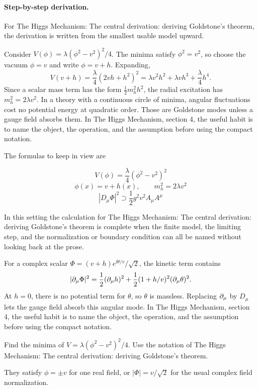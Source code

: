 \paragraph{Step-by-step derivation.}

For The Higgs Mechanism: The central derivation: deriving Goldstone's theorem, the derivation is written from the smallest usable model upward.

Consider \(V(\phi)=\lambda(\phi^2-v^2)^2/4\).  The minima satisfy \(\phi^2=v^2\), so choose the vacuum \(\phi=v\) and write \(\phi=v+h\).  Expanding,
\[
  V(v+h)=\frac{\lambda}{4}(2vh+h^2)^2
  =\lambda v^2h^2+\lambda vh^3+\frac{\lambda}{4}h^4.
\]
Since a scalar mass term has the form \(\frac12m_h^2h^2\), the radial excitation has \(m_h^2=2\lambda v^2\).  In a theory with a continuous circle of minima, angular fluctuations cost no potential energy at quadratic order.  Those are Goldstone modes unless a gauge field absorbs them.  In The Higgs Mechanism, section 4, the useful habit is to name the object, the operation, and the assumption before using the compact notation.

The formulas to keep in view are

\[
  V(\phi)=\frac{\lambda}{4}(\phi^2-v^2)^2
\]
\[
  \phi(x)=v+h(x),\qquad m_h^2=2\lambda v^2
\]
\[
  |D_\mu\Phi|^2\supset \frac12g^2v^2A_\mu A^\mu
\]

In this setting the calculation for The Higgs Mechanism: The central derivation: deriving Goldstone's theorem is complete when the finite model, the limiting step, and the normalization or boundary condition can all be named without looking back at the prose.




\begin{example}
For a complex scalar \(\Phi=(v+h)e^{\ii\theta/v}/\sqrt2\), the kinetic term contains
\[
  |\partial_\mu\Phi|^2=\frac12(\partial_\mu h)^2+\frac12(1+h/v)^2(\partial_\mu\theta)^2.
\]
At \(h=0\), there is no potential term for \(\theta\), so \(\theta\) is massless.  Replacing \(\partial_\mu\) by \(D_\mu\) lets the gauge field absorb this angular mode.  In The Higgs Mechanism, section 4, the useful habit is to name the object, the operation, and the assumption before using the compact notation.
\end{example}



\begin{exercise}
Find the minima of \(V=\lambda(\phi^2-v^2)^2/4\).  Use the notation of The Higgs Mechanism: The central derivation: deriving Goldstone's theorem.
\begin{answer}
They satisfy \(\phi=\pm v\) for one real field, or \(|\Phi|=v/\sqrt2\) for the usual complex field normalization.
\end{answer}
\end{exercise}

